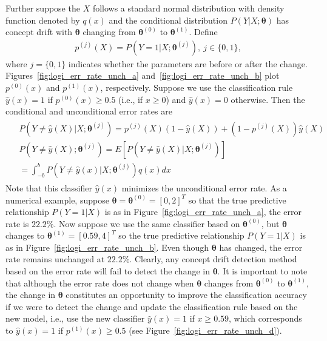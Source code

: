 \documentclass[twoside,11pt]{article}
\begin{document}
Further suppose the $X$ follows a standard normal distribution with density function denoted by $q(x)$ and the conditional distribution $P(Y|X;\bm{\theta})$ has concept drift with $\bm{\theta}$ changing from $\bm{\theta}^{(0)}$ to $\bm{\theta}^{(1)}$. Define 
\begin{align}
p^{(j)}(X)=P(Y=1|X;\bm{\theta}^{(j)}),~j\in\{0,1\},
\label{eqn:simp_nota_p}
\end{align}
where $j=\{0,1\}$ indicates whether the parameters are before or after the change. Figures~\ref{fig:logi_err_rate_unch_a} and~\ref{fig:logi_err_rate_unch_b} plot $p^{(0)}(x)$ and $p^{(1)}(x)$, respectively. Suppose we use the classification rule $\hat{y}(x)=1$ if $p^{(0)}(x)\geq 0.5$ (i.e., if $x\geq 0 $) and $\hat{y}(x)=0$ otherwise. Then the conditional and unconditional error rates are
\begin{align}
\begin{aligned}
&P(Y\neq\hat{y}(X)|X;\bm{\theta}^{(j)})
= p^{(j)}(X)(1-\hat{y}(X)) + (1-p^{(j)}(X))\hat{y}(X) \\
&P(Y\neq\hat{y}(X);\bm{\theta}^{(j)}) = E[P(Y\neq\hat{y}(X)|X;\bm{\theta}^{(j)})] \\ &= \int_{-b}^{b}P(Y\neq\hat{y}(x)|X;\bm{\theta}^{(j)})q(x)dx
\end{aligned}
\label{eqn:logi_err_rate}
\end{align}
Note that this classifier $\hat{y}(x)$ minimizes the unconditional error rate. As a numerical example, suppose $\bm{\theta} = \bm{\theta}^{(0)}=[0, 2]^T$ so that the true predictive relationship $P(Y=1|{X})$ is as in Figure~\ref{fig:logi_err_rate_unch_a}, the error rate is $22.2\%$. Now suppose we use the same classifier based on $\bm{\theta}^{(0)}$, but $\bm{\theta}$ changes to $\bm{\theta}^{(1)}=[0.59, 4]^T$ so the true predictive relationship $P(Y=1|{X})$ is as in Figure~\ref{fig:logi_err_rate_unch_b}. Even though $\bm{\theta}$ has changed, the error rate remains unchanged at $22.2\%$. Clearly, any concept drift detection method based on the error rate will fail to detect the change in $\bm{\theta}$. It is important to note that although the error rate does not change when $\bm{\theta}$ changes from $\bm{\theta}^{(0)}$ to $\bm{\theta}^{(1)}$, the change in $\bm{\theta}$ constitutes an opportunity to improve the classification accuracy if we were to detect the change and update the classification rule based on the new model, i.e., use the new classifier $\hat{y}(x)=1$ if $x \geq 0.59$, which corresponds to $\hat{y}(x)=1$ if $p^{(1)}(x)\geq 0.5$ (see Figure~\ref{fig:logi_err_rate_unch_d}).
\end{document}
